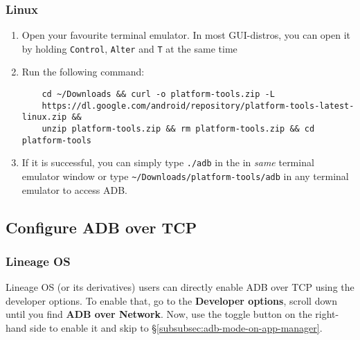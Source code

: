 \subsubsection{Linux} %
\begin{enumerate}
    \item Open your favourite terminal emulator. In most GUI-distros, you can open it by holding \texttt{Control},
    \texttt{Alter} and \texttt{T} at the same time
    \item Run the following command:
    \begin{verbatim}
    cd ~/Downloads && curl -o platform-tools.zip -L
    https://dl.google.com/android/repository/platform-tools-latest-linux.zip &&
    unzip platform-tools.zip && rm platform-tools.zip && cd platform-tools
    \end{verbatim}
    \item If it is successful, you can simply type \texttt{./adb} in the in \textit{same} terminal emulator window or
    type \texttt{\textasciitilde/Downloads/platform-tools/adb} in any terminal emulator to access ADB\@.
\end{enumerate}

\subsection{Configure ADB over TCP}\label{subsec:configure-adb-over-tcp} %

\subsubsection{Lineage OS}\label{subsubsec:lineage-os} %
Lineage OS (or its derivatives) users can directly enable ADB over TCP using the developer options. To enable that,
go to the \textbf{Developer options}, scroll down until you find \textbf{ADB over Network}. Now, use the toggle button
on the right-hand side to enable it and skip to §\cref{subsubsec:adb-mode-on-app-manager}.

